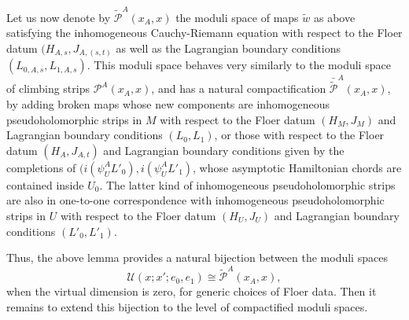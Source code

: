 \documentclass{amsart}
\numberwithin{equation}{section}
\numberwithin{figure}{section}
\begin{document}
	Let us now denote by $\tilde{\mathcal{P}}^{A}(x_{A}, x)$ the moduli space of maps $\tilde{w}$ as above satisfying the inhomogeneous Cauchy-Riemann equation with respect to the Floer datum $(H_{A, s}, J_{A, (s, t)}$ as well as the Lagrangian boundary conditions $(L_{0, A, s}, L_{1, A, s})$. This moduli space behaves very similarly to the moduli space of climbing strips $\mathcal{P}^{A}(x_{A}, x)$,  and has a natural compactification $\bar{\tilde{\mathcal{P}}}^{A}(x_{A}, x)$, by adding broken maps whose new components are inhomogeneous pseudoholomorphic strips in $M$ with respect to the Floer datum $(H_{M}, J_{M})$ and Lagrangian boundary conditions $(L_{0}, L_{1})$, or those with respect to the Floer datum $(H_{A}, J_{A, t})$ and Lagrangian boundary conditions given by the completions of $(i(\psi_{U}^{A}L'_{0}), i(\psi_{U}^{A}L'_{1})$, whose asymptotic Hamiltonian chords are contained inside $U_{0}$. The latter kind of inhomogeneous pseudoholomorphic strips are also in one-to-one correspondence with inhomogeneous pseudoholomorphic strips in $U$ with respect to the Floer datum $(H_{U}, J_{U})$ and Lagrangian boundary conditions $(L'_{0}, L'_{1})$. \par

	Thus, the above lemma provides a natural bijection between the moduli spaces
\begin{equation*}
\mathcal{U}(x; x'; e_{0}, e_{1}) \cong \tilde{\mathcal{P}}^{A}(x_{A}, x),
\end{equation*}
when the virtual dimension is zero, for generic choices of Floer data.
Then it remains to extend this bijection to the level of compactified moduli spaces. \par
\end{document}
